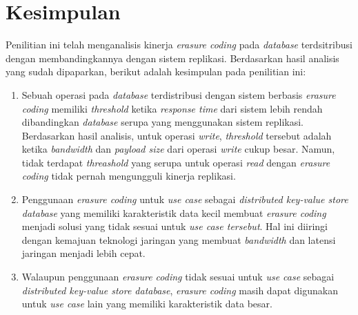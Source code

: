 \section{Kesimpulan}
\label{sec:kesimpulan}

Penilitian ini telah menganalisis kinerja \textit{erasure coding} pada \textit{database} terdsitribusi dengan membandingkannya dengan sistem replikasi. Berdasarkan hasil analisis yang sudah dipaparkan, berikut adalah kesimpulan pada penilitian ini:

\begin{enumerate}
  \item Sebuah operasi pada \textit{database} terdistribusi dengan sistem berbasis \textit{erasure coding} memiliki \textit{threshold} ketika \textit{response time} dari sistem lebih rendah dibandingkan \textit{database} serupa yang menggunakan sistem replikasi. Berdasarkan hasil analisis, untuk operasi \textit{write}, \textit{threshold} tersebut adalah ketika \textit{bandwidth} dan \textit{payload size} dari operasi \textit{write} cukup besar. Namun, tidak terdapat \textit{threashold} yang serupa untuk operasi \textit{read} dengan \textit{erasure coding} tidak pernah mengungguli kinerja replikasi.
  \item Penggunaan \textit{erasure coding} untuk \textit{use case} sebagai \textit{distributed key-value store database} yang memiliki karakteristik data kecil membuat \textit{erasure coding} menjadi solusi yang tidak sesuai untuk \textit{use case tersebut}. Hal ini diiringi dengan kemajuan teknologi jaringan yang membuat \textit{bandwidth} dan latensi jaringan menjadi lebih cepat.
  \item Walaupun penggunaan \textit{erasure coding} tidak sesuai untuk \textit{use case} sebagai \textit{distributed key-value store database}, \textit{erasure coding} masih dapat digunakan untuk \textit{use case} lain yang memiliki karakteristik data besar.
\end{enumerate}

